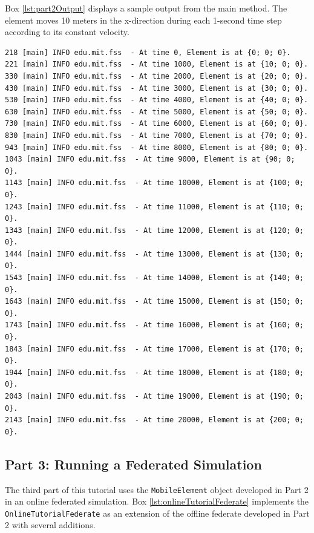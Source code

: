 \documentclass[]{article}
\begin{document}
Box \ref{lst:part2Output} displays a sample output from the main method. The element moves 10 meters in the x-direction during each 1-second time step according to its constant velocity.

\begin{Code}
\begin{lstlisting}[caption={OfflineTutorialFederate main output},label={lst:part2Output},numbers=none]
218 [main] INFO edu.mit.fss  - At time 0, Element is at {0; 0; 0}.
221 [main] INFO edu.mit.fss  - At time 1000, Element is at {10; 0; 0}.
330 [main] INFO edu.mit.fss  - At time 2000, Element is at {20; 0; 0}.
430 [main] INFO edu.mit.fss  - At time 3000, Element is at {30; 0; 0}.
530 [main] INFO edu.mit.fss  - At time 4000, Element is at {40; 0; 0}.
630 [main] INFO edu.mit.fss  - At time 5000, Element is at {50; 0; 0}.
730 [main] INFO edu.mit.fss  - At time 6000, Element is at {60; 0; 0}.
830 [main] INFO edu.mit.fss  - At time 7000, Element is at {70; 0; 0}.
943 [main] INFO edu.mit.fss  - At time 8000, Element is at {80; 0; 0}.
1043 [main] INFO edu.mit.fss  - At time 9000, Element is at {90; 0; 0}.
1143 [main] INFO edu.mit.fss  - At time 10000, Element is at {100; 0; 0}.
1243 [main] INFO edu.mit.fss  - At time 11000, Element is at {110; 0; 0}.
1343 [main] INFO edu.mit.fss  - At time 12000, Element is at {120; 0; 0}.
1444 [main] INFO edu.mit.fss  - At time 13000, Element is at {130; 0; 0}.
1543 [main] INFO edu.mit.fss  - At time 14000, Element is at {140; 0; 0}.
1643 [main] INFO edu.mit.fss  - At time 15000, Element is at {150; 0; 0}.
1743 [main] INFO edu.mit.fss  - At time 16000, Element is at {160; 0; 0}.
1843 [main] INFO edu.mit.fss  - At time 17000, Element is at {170; 0; 0}.
1944 [main] INFO edu.mit.fss  - At time 18000, Element is at {180; 0; 0}.
2043 [main] INFO edu.mit.fss  - At time 19000, Element is at {190; 0; 0}.
2143 [main] INFO edu.mit.fss  - At time 20000, Element is at {200; 0; 0}.
\end{lstlisting}
\end{Code}

\subsection{Part 3: Running a Federated Simulation}

The third part of this tutorial uses the \texttt{MobileElement} object developed in Part 2 in an online federated simulation. Box \ref{lst:onlineTutorialFederate} implements the \texttt{OnlineTutorialFederate} as an extension of the offline federate developed in Part 2 with several additions. 
\end{document}
